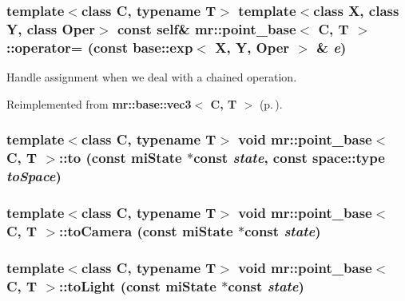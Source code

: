 \subsubsection{\setlength{\rightskip}{0pt plus 5cm}template$<$class C, typename T$>$ template$<$class X, class Y, class Oper$>$ const {\bf self}\& {\bf mr::point\_\-base}$<$ C, T $>$::operator= (const {\bf base::exp}$<$ X, Y, Oper $>$ \& {\em e})\hspace{0.3cm}{\tt  [inline]}}\label{structmr_1_1point__base_z77_0}


Handle assignment when we deal with a chained operation. 



Reimplemented from {\bf mr::base::vec3$<$ C, T $>$} {\rm (p.\,\pageref{structmr_1_1base_1_1vec3_z36_0})}.
\subsubsection{\setlength{\rightskip}{0pt plus 5cm}template$<$class C, typename T$>$ void {\bf mr::point\_\-base}$<$ C, T $>$::to (const mi\-State $\ast$const {\em state}, const {\bf space::type} {\em to\-Space})\hspace{0.3cm}{\tt  [inline]}}\label{structmr_1_1point__base_z74_14}


\subsubsection{\setlength{\rightskip}{0pt plus 5cm}template$<$class C, typename T$>$ void {\bf mr::point\_\-base}$<$ C, T $>$::to\-Camera (const mi\-State $\ast$const {\em state})\hspace{0.3cm}{\tt  [inline]}}\label{structmr_1_1point__base_z74_2}


\subsubsection{\setlength{\rightskip}{0pt plus 5cm}template$<$class C, typename T$>$ void {\bf mr::point\_\-base}$<$ C, T $>$::to\-Light (const mi\-State $\ast$const {\em state})\hspace{0.3cm}{\tt  [inline]}}\label{structmr_1_1point__base_z74_6}


